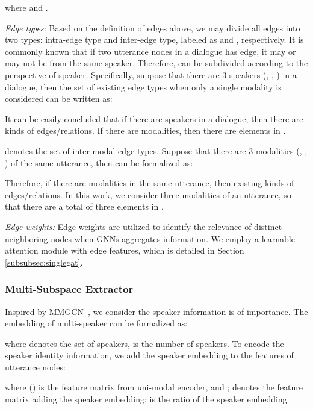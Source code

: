 \documentclass[lettersize,journal]{IEEEtran}
\begin{document}
where  and .

\textit{Edge types:} Based on the definition of edges above, we may divide all edges into two types: intra-edge type and inter-edge type, labeled as  and , respectively. It is commonly known that if two utterance nodes in a dialogue has edge, it may or may not be from the same speaker. Therefore,  can be subdivided according to the perspective of speaker. Specifically, suppose that there are 3 speakers (, , ) in a dialogue, then the set of existing edge types when only a single modality is considered can be written as:

It can be easily concluded that if there are  speakers in a dialogue, then there are  kinds of edges/relations. If there are  modalities, then there are  elements in . 

 denotes the set of inter-modal edge types. Suppose that there are 3 modalities (, , ) of the same utterance, then  can be formalized as:

Therefore, if there are  modalities in the same utterance, then existing  kinds of edges/relations. In this work, we consider three modalities of an utterance, so that there are a total of three elements in .

\textit{Edge weights:} Edge weights are utilized to identify the relevance of distinct neighboring nodes when GNNs aggregates information. We employ a learnable attention module with edge features, which is detailed in Section \ref{subsubsec:singlegat}.

\subsubsection{Multi-Subspace Extractor}
Inspired by MMGCN~\cite{hu2021mmgcn}, we consider the speaker information is of importance. The embedding of multi-speaker  can be formalized as:

where  denotes the set of speakers,  is the number of speakers. To encode the speaker identity information, we add the speaker embedding to the features of utterance nodes:

where  () is the feature matrix from uni-modal encoder, and ;  denotes the feature matrix adding the speaker embedding;  is the ratio of the speaker embedding.
\end{document}
